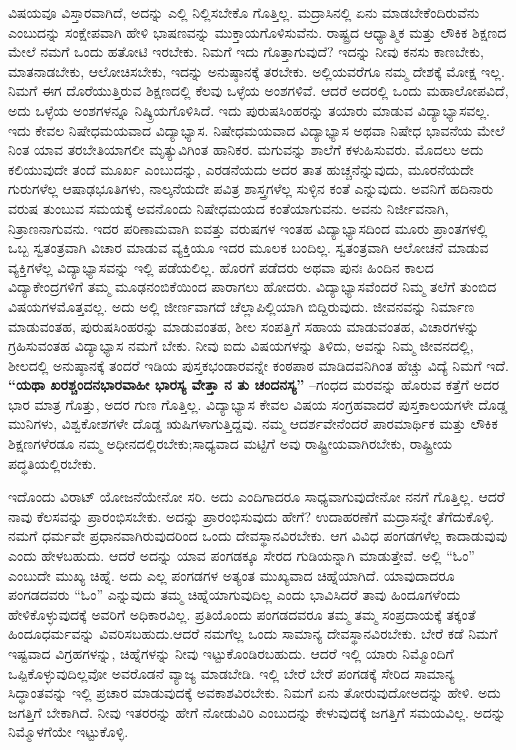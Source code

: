 ವಿಷಯವೂ ವಿಸ್ತಾರವಾಗಿದೆ, ಅದನ್ನು ಎಲ್ಲಿ ನಿಲ್ಲಿಸಬೇಕೊ ಗೊತ್ತಿಲ್ಲ. ಮದ್ರಾಸಿನಲ್ಲಿ ಏನು ಮಾಡಬೇಕೆಂದಿರುವೆನು ಎಂಬುದನ್ನು ಸಂಕ್ಷೇಪವಾಗಿ ಹೇಳಿ ಭಾಷಣವನ್ನು ಮುಕ್ತಾಯಗೊಳಿಸುವೆನು. ರಾಷ್ಟ್ರದ ಆಧ್ಯಾತ್ಮಿಕ ಮತ್ತು ಲೌಕಿಕ ಶಿಕ್ಷಣದ ಮೇಲೆ ನಮಗೆ ಒಂದು ಹತೋಟಿ ಇರಬೇಕು. ನಿಮಗೆ ಇದು ಗೊತ್ತಾಗುವುದೆ? ಇದನ್ನು ನೀವು ಕನಸು ಕಾಣಬೇಕು, ಮಾತನಾಡಬೇಕು, ಆಲೋಚಿಸಬೇಕು, ಇದನ್ನು ಅನುಷ್ಠಾನಕ್ಕೆ ತರಬೇಕು. ಅಲ್ಲಿಯವರೆಗೂ ನಮ್ಮ ದೇಶಕ್ಕೆ ಮೋಕ್ಷ ಇಲ್ಲ. ನಿಮಗೆ ಈಗ ದೊರೆಯುತ್ತಿರುವ ಶಿಕ್ಷಣದಲ್ಲಿ ಕೆಲವು ಒಳ್ಳೆಯ ಅಂಶಗಳಿವೆ. ಆದರೆ ಅದರಲ್ಲಿ ಒಂದು ಮಹಾಲೋಪವಿದೆ, ಅದು ಒಳ್ಳೆಯ ಅಂಶಗಳನ್ನೂ ನಿಷ್ಕ್ರಿಯಗೊಳಿಸಿದೆ. ಇದು ಪುರುಷಸಿಂಹರನ್ನು ತಯಾರು ಮಾಡುವ ವಿದ್ಯಾಭ್ಯಾಸವಲ್ಲ. ಇದು ಕೇವಲ ನಿಷೇಧಮಯವಾದ ವಿದ್ಯಾಭ್ಯಾಸ. ನಿಷೇಧಮಯವಾದ ವಿದ್ಯಾಭ್ಯಾಸ ಅಥವಾ ನಿಷೇಧ ಭಾವನೆಯ ಮೇಲೆ ನಿಂತ ಯಾವ ತರಬೇತಿಯಾಗಲೀ ಮೃತ್ಯುವಿಗಿಂತ ಹಾನಿಕರ. ಮಗುವನ್ನು ಶಾಲೆಗೆ ಕಳುಹಿಸುವರು. ಮೊದಲು ಅದು ಕಲಿಯುವುದೇ ತಂದೆ ಮೂರ್ಖ ಎಂಬುದನ್ನು, ಎರಡನೆಯದು ಅದರ ತಾತ ಹುಚ್ಚನೆನ್ನುವುದು, ಮೂರನೆಯದೇ ಗುರುಗಳೆಲ್ಲ ಆಷಾಢಭೂತಿಗಳು, ನಾಲ್ಕನೆಯದೇ ಪವಿತ್ರ ಶಾಸ್ತ್ರಗಳೆಲ್ಲ ಸುಳ್ಳಿನ ಕಂತೆ ಎನ್ನುವುದು. ಅವನಿಗೆ ಹದಿನಾರು ವರುಷ ತುಂಬುವ ಸಮಯಕ್ಕೆ ಅವನೊಂದು ನಿಷೇಧಮಯದ ಕಂತೆಯಾಗುವನು. ಅವನು ನಿರ್ಜೀವನಾಗಿ, ನಿತ್ರಾಣನಾಗುವನು. ಇದರ ಪರಿಣಾಮವಾಗಿ ಐವತ್ತು ವರುಷಗಳ ಇಂತಹ ವಿದ್ಯಾಭ್ಯಾಸದಿಂದ ಮೂರು ಪ್ರಾಂತಗಳಲ್ಲಿ ಒಬ್ಬ ಸ್ವತಂತ್ರವಾಗಿ ವಿಚಾರ ಮಾಡುವ ವ್ಯಕ್ತಿಯೂ ಇದರ ಮೂಲಕ ಬಂದಿಲ್ಲ. ಸ್ವತಂತ್ರವಾಗಿ ಆಲೋಚನೆ ಮಾಡುವ ವ್ಯಕ್ತಿಗಳೆಲ್ಲ ವಿದ್ಯಾಭ್ಯಾಸವನ್ನು ಇಲ್ಲಿ ಪಡೆಯಲಿಲ್ಲ. ಹೊರಗೆ ಪಡೆದರು ಅಥವಾ ಪುನಃ ಹಿಂದಿನ ಕಾಲದ ವಿದ್ಯಾಕೇಂದ್ರಗಳಿಗೆ ತಮ್ಮ ಮೂಢನಂಬಿಕೆಯಿಂದ ಪಾರಾಗಲು ಹೋದರು. ವಿದ್ಯಾಭ್ಯಾಸವೆಂದರೆ ನಿಮ್ಮ ತಲೆಗೆ ತುಂಬಿದ ವಿಷಯಗಳ\break ಮೊತ್ತವಲ್ಲ. ಅದು ಅಲ್ಲಿ ಜೀರ್ಣವಾಗದೆ ಚೆಲ್ಲಾಪಿಲ್ಲಿಯಾಗಿ ಬಿದ್ದಿರುವುದು. ಜೀವನವನ್ನು ನಿರ್ಮಾಣ ಮಾಡುವಂತಹ, ಪುರುಷಸಿಂಹರನ್ನು ಮಾಡುವಂತಹ, ಶೀಲ ಸಂಪತ್ತಿಗೆ ಸಹಾಯ ಮಾಡುವಂತಹ, ವಿಚಾರಗಳನ್ನು ಗ್ರಹಿಸುವಂತಹ ವಿದ್ಯಾಭ್ಯಾಸ ನಮಗೆ ಬೇಕು. ನೀವು ಐದು ವಿಷಯಗಳನ್ನು ತಿಳಿದು, ಅವನ್ನು ನಿಮ್ಮ ಜೀವನದಲ್ಲಿ, ಶೀಲದಲ್ಲಿ ಅನುಷ್ಠಾನಕ್ಕೆ ತಂದರೆ ಇಡಿಯ ಪುಸ್ತಕಭಂಡಾರವನ್ನೇ ಕಂಠಪಾಠ ಮಾಡಿದವನಿಗಿಂತ ಹೆಚ್ಚು ವಿದ್ಯೆ ನಿಮಗೆ ಇದೆ. \textbf{“ಯಥಾ ಖರಶ್ಚಂದನಭಾರವಾಹೀ ಭಾರಸ್ಯ ವೇತ್ತಾ ನ ತು ಚಂದನಸ್ಯ”} –ಗಂಧದ ಮರವನ್ನು ಹೊರುವ ಕತ್ತೆಗೆ ಅದರ ಭಾರ ಮಾತ್ರ ಗೊತ್ತು, ಅದರ ಗುಣ ಗೊತ್ತಿಲ್ಲ. ವಿದ್ಯಾಭ್ಯಾಸ ಕೇವಲ ವಿಷಯ ಸಂಗ್ರಹವಾದರೆ ಪುಸ್ತಕಾಲಯಗಳೇ ದೊಡ್ಡ ಮುನಿಗಳು, ವಿಶ್ವಕೋಶಗಳೇ ದೊಡ್ಡ ಋಷಿಗಳಾಗುತ್ತಿದ್ದವು. ನಮ್ಮ ಆದರ್ಶವೇನೆಂದರೆ ಪಾರಮಾರ್ಥಿಕ ಮತ್ತು ಲೌಕಿಕ ಶಿಕ್ಷಣಗಳೆರಡೂ ನಮ್ಮ ಅಧೀನದಲ್ಲಿರಬೇಕು;\break ಸಾಧ್ಯವಾದ ಮಟ್ಟಿಗೆ ಅವು ರಾಷ್ಟ್ರೀಯವಾಗಿರಬೇಕು, ರಾಷ್ಟ್ರೀಯ ಪದ್ಧತಿ\-ಯಲ್ಲಿರಬೇಕು.

\vskip -1pt

ಇದೊಂದು ವಿರಾಟ್​ ಯೋಜನೆಯೇನೋ ಸರಿ. ಅದು ಎಂದಿಗಾದರೂ ಸಾಧ್ಯವಾಗುವುದೇನೋ ನನಗೆ ಗೊತ್ತಿಲ್ಲ. ಆದರೆ ನಾವು ಕೆಲಸವನ್ನು ಪ್ರಾರಂಭಿಸಬೇಕು. ಅದನ್ನು ಪ್ರಾರಂಭಿಸುವುದು ಹೇಗೆ? ಉದಾಹರಣೆಗೆ ಮದ್ರಾಸನ್ನೇ ತೆಗೆದು\-ಕೊಳ್ಳಿ. ನಮಗೆ ಧರ್ಮವೇ ಪ್ರಧಾನವಾಗಿರುವುದರಿಂದ ಒಂದು ದೇವಸ್ಥಾನವಿರಬೇಕು. ಆಗ ವಿವಿಧ ಪಂಗಡಗಳೆಲ್ಲ ಕಾದಾಡುವುವು ಎಂದು ಹೇಳಬಹುದು. ಆದರೆ ಅದನ್ನು ಯಾವ ಪಂಗಡಕ್ಕೂ ಸೇರದ ಗುಡಿಯನ್ನಾಗಿ ಮಾಡುತ್ತೇವೆ. ಅಲ್ಲಿ “ಓಂ” ಎಂಬುದೇ ಮುಖ್ಯ ಚಿಹ್ನೆ. ಅದು ಎಲ್ಲ ಪಂಗಡಗಳ ಅತ್ಯಂತ ಮುಖ್ಯವಾದ ಚಿಹ್ನೆಯಾಗಿದೆ. ಯಾವುದಾದರೂ ಪಂಗಡದವರು “ಓಂ” ಎನ್ನುವುದು ತಮ್ಮ ಚಿಹ್ನೆಯಾಗುವುದಿಲ್ಲ ಎಂದು ಭಾವಿಸಿದರೆ ತಾವು ಹಿಂದೂಗಳೆಂದು ಹೇಳಿಕೊಳ್ಳುವುದಕ್ಕೆ ಅವರಿಗೆ ಅಧಿಕಾರವಿಲ್ಲ. ಪ್ರತಿಯೊಂದು ಪಂಗಡದವರೂ ತಮ್ಮ ತಮ್ಮ ಸಂಪ್ರದಾಯಕ್ಕೆ ತಕ್ಕಂತೆ ಹಿಂದೂಧರ್ಮವನ್ನು ವಿವರಿಸಬಹುದು.\break ಆದರೆ ನಮಗೆಲ್ಲ ಒಂದು ಸಾಮಾನ್ಯ ದೇವಸ್ಥಾನವಿರಬೇಕು. ಬೇರೆ ಕಡೆ ನಿಮಗೆ ಇಷ್ಟವಾದ ವಿಗ್ರಹಗಳನ್ನು, ಚಿಹ್ನೆಗಳನ್ನು ನೀವು ಇಟ್ಟುಕೊಂಡಿರಬಹುದು. ಆದರೆ ಇಲ್ಲಿ ಯಾರು ನಿಮ್ಮೊಂದಿಗೆ ಒಪ್ಪಿಕೊಳ್ಳುವುದಿಲ್ಲವೋ ಅವರೊಡನೆ ವ್ಯಾಜ್ಯ ಮಾಡಬೇಡಿ. ಇಲ್ಲಿ ಬೇರೆ ಬೇರೆ ಪಂಗಡಕ್ಕೆ ಸೇರಿದ ಸಾಮಾನ್ಯ ಸಿದ್ಧಾಂತವನ್ನು ಇಲ್ಲಿ ಪ್ರಚಾರ ಮಾಡುವುದಕ್ಕೆ ಅವಕಾಶವಿರಬೇಕು. ನಿಮಗೆ ಏನು ತೋರುವುದೋ\break ಅದನ್ನು ಹೇಳಿ. ಅದು ಜಗತ್ತಿಗೆ ಬೇಕಾಗಿದೆ. ನೀವು ಇತರರನ್ನು ಹೇಗೆ ನೋಡುವಿರಿ ಎಂಬುದನ್ನು ಕೇಳುವುದಕ್ಕೆ ಜಗತ್ತಿಗೆ ಸಮಯವಿಲ್ಲ. ಅದನ್ನು ನಿಮ್ಮೊಳಗೆಯೇ ಇಟ್ಟುಕೊಳ್ಳಿ.


